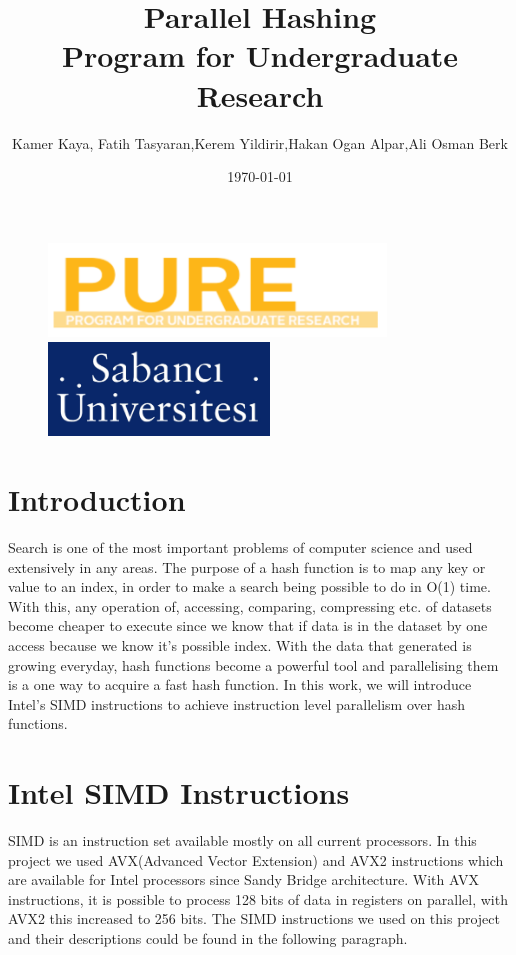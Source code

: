 \documentclass[11pt,oneside,a4paper]{article}
\title{\vspace*{40.0mm}
  \bf\sf Parallel Hashing
         \vspace*{20.0mm} \\
  \vspace*{40.0mm}
  \Large\bf\sf Program for Undergraduate Research \vspace*{20.0mm}}
\author{\sf Kamer Kaya, Fatih Tasyaran,Kerem Yildirir,Hakan Ogan Alpar,Ali Osman Berk}
\date{\sf \today}
\makeatletter
\def\cleardoublepage{\clearpage\if@twoside \ifodd\c@page\else%
\hbox{}%
\thispagestyle{empty}%
\clearpage%
\if@twocolumn\hbox{}\clearpage\fi\fi\fi}
\makeatother
\begin{document}
\begin{figure}
  \parbox[t]{40mm}{
    \begin{flushleft}
      \includegraphics[height=25mm]{pure.png}
    \end{flushleft}}
    \hspace{7cm}
  \parbox[t]{40mm}{
    \begin{flushright}
      \includegraphics[height=25mm]{sabanj.png}
    \end{flushright}}
\end{figure}

\maketitle
\thispagestyle{empty}
\raggedbottom

\cleardoublepage
{}
\setcounter{tocdepth}{2}
\tableofcontents


\section{Introduction}
\par Search is one of the most important problems of computer science and used extensively in any areas. The purpose of a hash function is to map any key or value to an index, in order to make a search being possible to do in O(1) time. With this, any operation of, accessing, comparing, compressing etc. of datasets become cheaper to execute since we know that if data is in the dataset by one access because we know it's possible index. With the data that generated is growing
everyday, hash functions become a powerful tool and parallelising them is a one way to acquire a fast hash function. In this work, we will introduce Intel's SIMD instructions to achieve instruction level parallelism over hash functions.
\section{Intel SIMD Instructions}
SIMD is an instruction set available mostly on all current processors. In this project we used AVX(Advanced Vector Extension) and AVX2 instructions which are available for Intel processors since Sandy Bridge architecture. With AVX instructions, it is possible to process 128 bits of data in registers on parallel, with AVX2 this increased to 256 bits. The SIMD instructions we used on this project and their descriptions could be found in the following paragraph.
\end{document}
